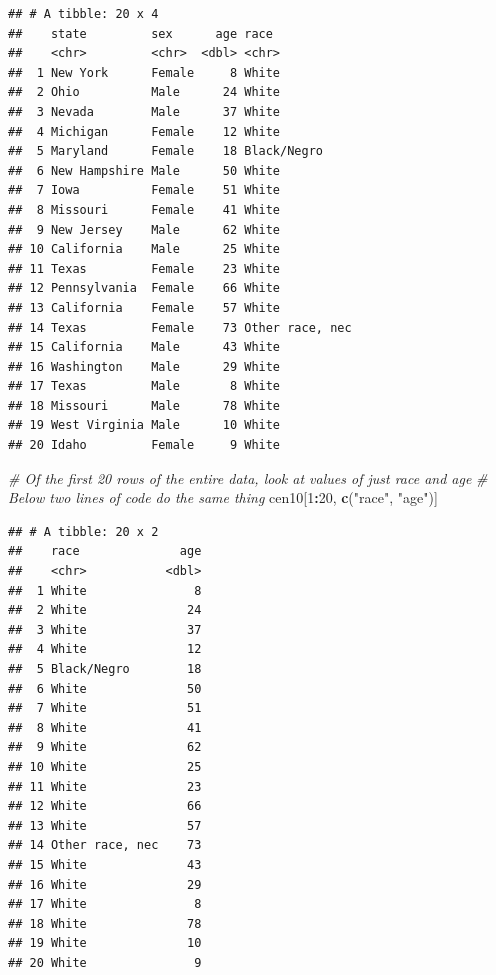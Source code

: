 \documentclass[
]{book}
\newenvironment{Shaded}{\begin{snugshade}}{\end{snugshade}}
\newcommand{\CommentTok}[1]{\textcolor[rgb]{0.56,0.35,0.01}{\textit{#1}}}
\newcommand{\DecValTok}[1]{\textcolor[rgb]{0.00,0.00,0.81}{#1}}
\newcommand{\KeywordTok}[1]{\textcolor[rgb]{0.13,0.29,0.53}{\textbf{#1}}}
\newcommand{\NormalTok}[1]{#1}
\newcommand{\OperatorTok}[1]{\textcolor[rgb]{0.81,0.36,0.00}{\textbf{#1}}}
\newcommand{\StringTok}[1]{\textcolor[rgb]{0.31,0.60,0.02}{#1}}
\theoremstyle{definition}
\theoremstyle{definition}
\theoremstyle{definition}
\theoremstyle{definition}
\theoremstyle{remark}
\begin{document}
\begin{verbatim}
## # A tibble: 20 x 4
##    state         sex      age race           
##    <chr>         <chr>  <dbl> <chr>          
##  1 New York      Female     8 White          
##  2 Ohio          Male      24 White          
##  3 Nevada        Male      37 White          
##  4 Michigan      Female    12 White          
##  5 Maryland      Female    18 Black/Negro    
##  6 New Hampshire Male      50 White          
##  7 Iowa          Female    51 White          
##  8 Missouri      Female    41 White          
##  9 New Jersey    Male      62 White          
## 10 California    Male      25 White          
## 11 Texas         Female    23 White          
## 12 Pennsylvania  Female    66 White          
## 13 California    Female    57 White          
## 14 Texas         Female    73 Other race, nec
## 15 California    Male      43 White          
## 16 Washington    Male      29 White          
## 17 Texas         Male       8 White          
## 18 Missouri      Male      78 White          
## 19 West Virginia Male      10 White          
## 20 Idaho         Female     9 White
\end{verbatim}

\begin{Shaded}
\begin{Highlighting}[]
\CommentTok{# Of the first 20 rows of the entire data, look at values of just race and age}
\CommentTok{# Below two lines of code do the same thing}
\NormalTok{cen10[}\DecValTok{1}\OperatorTok{:}\DecValTok{20}\NormalTok{, }\KeywordTok{c}\NormalTok{(}\StringTok{"race"}\NormalTok{, }\StringTok{"age"}\NormalTok{)]}
\end{Highlighting}
\end{Shaded}

\begin{verbatim}
## # A tibble: 20 x 2
##    race              age
##    <chr>           <dbl>
##  1 White               8
##  2 White              24
##  3 White              37
##  4 White              12
##  5 Black/Negro        18
##  6 White              50
##  7 White              51
##  8 White              41
##  9 White              62
## 10 White              25
## 11 White              23
## 12 White              66
## 13 White              57
## 14 Other race, nec    73
## 15 White              43
## 16 White              29
## 17 White               8
## 18 White              78
## 19 White              10
## 20 White               9
\end{verbatim}
\end{document}

